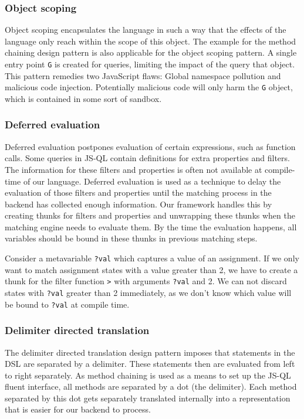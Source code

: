 \subsubsection*{Object scoping}

Object scoping encapsulates the language in such a way that the effects of the language only reach within the scope of this object. The example for the method chaining design pattern is also applicable for the object scoping pattern. A single entry point \texttt{G} is created for queries, limiting the impact of the query that object. This pattern remedies two JavaScript flaws: Global namespace pollution and malicious code injection. Potentially malicious code will only harm the \texttt{G} object, which is contained in some sort of sandbox.

\subsubsection*{Deferred evaluation}
Deferred evaluation postpones evaluation of certain expressions, such as function calls. Some queries in JS-QL contain definitions for extra properties and filters. The information for these filters and properties is often not available at compile-time of our language. Deferred evaluation is used as a technique to delay the evaluation of those filters and properties until the matching process in the backend has collected enough information. Our framework handles this by creating thunks for filters and properties and unwrapping these thunks when the matching engine needs to evaluate them. By the time the evaluation happens, all variables should be bound in these thunks in previous matching steps.
\begin{exmp}
Consider a metavariable \texttt{?val} which captures a value of an assignment. If we only want to match assignment states with a value greater than 2, we have to create a thunk for the filter function \texttt{>} with arguments \texttt{?val} and 2. We can not discard states with \texttt{?val} greater than 2 immediately, as we don't know which value will be bound to \texttt{?val} at compile time.
\end{exmp}

\subsubsection*{Delimiter directed translation}
The delimiter directed translation design pattern imposes that statements in the DSL are separated by a delimiter. These statements then are evaluated from left to right separately. As method chaining is used as a means to set up the JS-QL fluent interface, all methods are separated by a dot (the delimiter). Each method separated by this dot gets separately translated internally into a representation that is easier for our backend to process.

